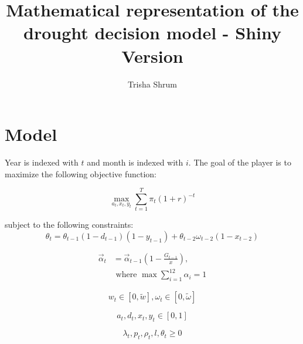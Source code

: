 \documentclass[11pt]{article}
\title{Mathematical representation of the drought decision model - Shiny Version}
\author{Trisha Shrum}
\begin{document}
\maketitle

\section{Model}

Year is indexed with $t$ and month is indexed with $i$. The goal of the player is to maximize the following objective function:

\begin{equation}
\max_{a_t, x_t, y_t} \sum_{t=1}^T \pi_t(1+r)^{-t}
\end{equation}

subject to the following constraints:
\begin{equation}
\theta_t = \theta_{t-1} (1- d_{t-1}) (1 - y_{t-1}) + \theta_{t-2} \omega_{t-2} (1 - x_{t-2})
\end{equation} 

\begin{align}
\vec{\alpha}_t &= \vec{\alpha}_{t-1} \left(1 - \frac{G_{t-1}}{x}\right), \\
&\text{ where } \max \sum_{i=1}^{12} \alpha_{i}  = 1 
\end{align}


\begin{equation}
w_t \in [0,\tilde{w}],  \omega_t \in [0,\tilde{\omega}]
\end{equation}

\begin{equation}
a_t, d_t, x_t, y_t \in [0,1]
\end{equation}

\begin{equation}
\lambda_t, p_t, \rho_t, l, \theta_t \ge 0 
\end{equation}
\end{document}
